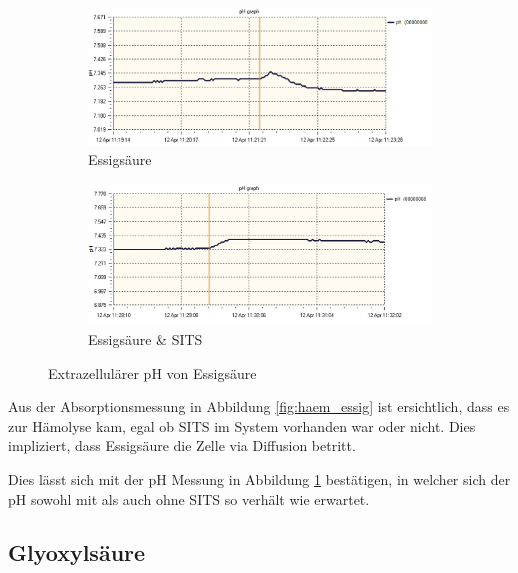 \documentclass[a4paper,german]{scrreprt}
\begin{document}
\begin{figure}
	\centering
	\begin{subfigure}{.5\textwidth}
		\centering
		\includegraphics[width=\linewidth]{img/ph_essig.png}
		\caption{Essigsäure}
	\end{subfigure}%
	\begin{subfigure}{.5\textwidth}
		\centering
		\includegraphics[width=\linewidth]{img/ph_essig_sits.png}
		\caption{Essigsäure \& SITS}
	\end{subfigure}
	\caption{Extrazellulärer pH von Essigsäure}
	\label{fig:ph_essig}
\end{figure}

Aus der Absorptionsmessung in Abbildung \ref{fig:haem_essig} ist ersichtlich,
dass es zur Hämolyse kam, egal ob SITS im System vorhanden war oder nicht. Dies
impliziert, dass Essigsäure die Zelle via Diffusion betritt.

Dies lässt sich mit der pH Messung in Abbildung \ref{fig:ph_essig} bestätigen,
in welcher sich der pH sowohl mit als auch ohne SITS so verhält wie erwartet.

\subsection{Glyoxylsäure}
\end{document}

